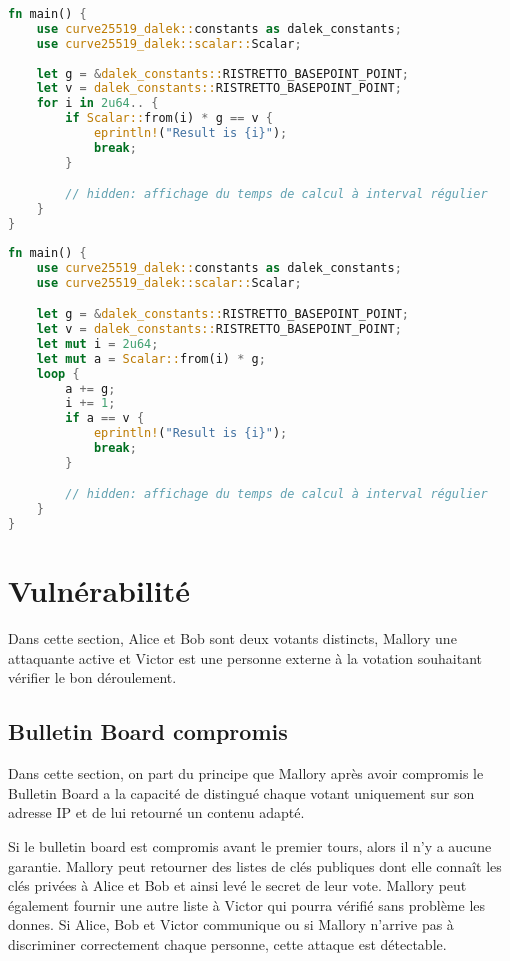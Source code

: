 \documentclass[../report]{subfiles}
\begin{document}
\begin{lstlisting}[language=Rust,caption={Vitesse de calcul résultat final (très naif)},style=numbers,label={lst:perf:resultat-1}]
fn main() {
    use curve25519_dalek::constants as dalek_constants;
    use curve25519_dalek::scalar::Scalar;
        
    let g = &dalek_constants::RISTRETTO_BASEPOINT_POINT;
    let v = dalek_constants::RISTRETTO_BASEPOINT_POINT;
    for i in 2u64.. {
        if Scalar::from(i) * g == v {
            eprintln!("Result is {i}");
            break;
        }

        // hidden: affichage du temps de calcul à interval régulier
    }
}
\end{lstlisting}%
\begin{lstlisting}[language=Rust,caption={Vitesse de calcul résultat final (un peu moins naif)},style=numbers,label={lst:perf:resultat-2}]
fn main() {
    use curve25519_dalek::constants as dalek_constants;
    use curve25519_dalek::scalar::Scalar;

    let g = &dalek_constants::RISTRETTO_BASEPOINT_POINT;
    let v = dalek_constants::RISTRETTO_BASEPOINT_POINT;
    let mut i = 2u64;
    let mut a = Scalar::from(i) * g;
    loop {
        a += g;
        i += 1;
        if a == v {
            eprintln!("Result is {i}");
            break;
        }

        // hidden: affichage du temps de calcul à interval régulier
    }
}
\end{lstlisting}%

\chapter{Vulnérabilité}

Dans cette section, Alice et Bob sont deux votants distincts, Mallory une attaquante active et Victor est une personne externe à la votation 
souhaitant vérifier le bon déroulement.

\section{Bulletin Board compromis}

Dans cette section, on part du principe que Mallory après avoir compromis le Bulletin Board a la capacité
de distingué chaque votant uniquement sur son adresse IP et de lui retourné un contenu adapté.

Si le bulletin board est compromis avant le premier tours, alors il n'y a aucune garantie.
Mallory peut retourner des listes de clés publiques dont elle connaît les clés privées à Alice et Bob et ainsi levé 
le secret de leur vote. Mallory peut également fournir une autre liste à Victor qui pourra vérifié sans problème les donnes.
Si Alice, Bob et Victor communique ou si Mallory n'arrive pas à discriminer correctement chaque personne, cette attaque est 
détectable.
\end{document}
